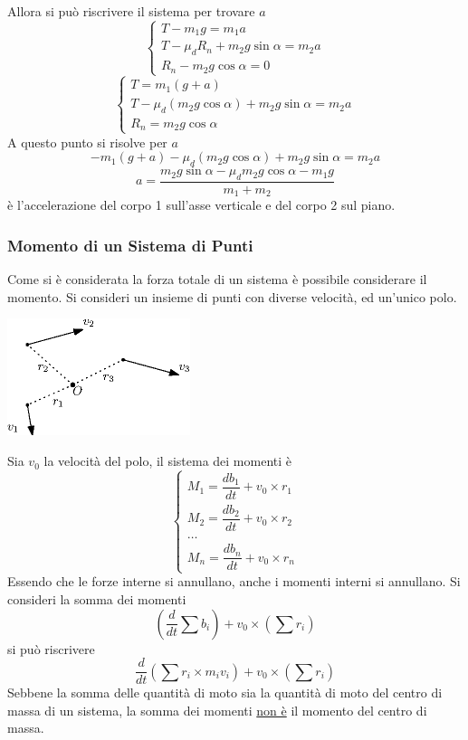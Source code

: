 \documentclass[10pt, letterpaper]{report}
\begin{document}
Allora si può riscrivere il sistema per trovare $a$ 
$$\begin{cases}
    T-m_1g=m_1a \\
    T-\mu_dR_n+m_2g\sin\alpha=m_2a \\ 
    R_n-m_2g\cos\alpha = 0
\end{cases}$$$$\begin{cases}
    T=m_1(g+a) \\
    T-\mu_d(m_2g\cos\alpha )+m_2g\sin\alpha=m_2a \\ 
    R_n=m_2g\cos\alpha 
\end{cases}$$ 
A questo punto si risolve per $a$
$$ -m_1(g+a)-\mu_d(m_2g\cos\alpha )+m_2g\sin\alpha=m_2a$$
$$ a=\frac{m_2g\sin\alpha-\mu_dm_2g\cos\alpha-m_1g}{m_1+m_2}$$
è l'accelerazione del corpo 1 sull'asse verticale e del corpo 2 sul piano.
\subsubsection{Momento di un Sistema di Punti}
Come si è considerata la forza totale di un sistema è possibile considerare il momento. Si consideri un insieme di punti con diverse velocità, ed un'unico polo.\begin{center}
    \includegraphics[width=0.4\textwidth ]{images/momentoPunti.eps}
\end{center}
Sia $v_0$ la velocità del polo, il sistema dei momenti è $$ \begin{cases}
    M_1=\dfrac{db_1}{dt}+v_0\times r_1\\ 
    M_2=\dfrac{db_2}{dt}+v_0\times r_2\\
    \dots \\ 
    M_n=\dfrac{db_n}{dt}+v_0\times r_n
\end{cases}$$
Essendo che le forze interne si annullano, anche i momenti interni si annullano. Si consideri la somma dei momenti $$ (\dfrac{d}{dt}\sum{b_i})+v_0\times (\sum r_i)$$
si può riscrivere 
 $$ \dfrac{d}{dt}(\sum{r_i\times m_iv_i})+v_0\times (\sum r_i)$$
Sebbene la somma delle quantità di moto sia la quantità di moto del centro di massa di un sistema, la somma dei momenti \underline{non è} il momento del centro di massa.
\end{document}
